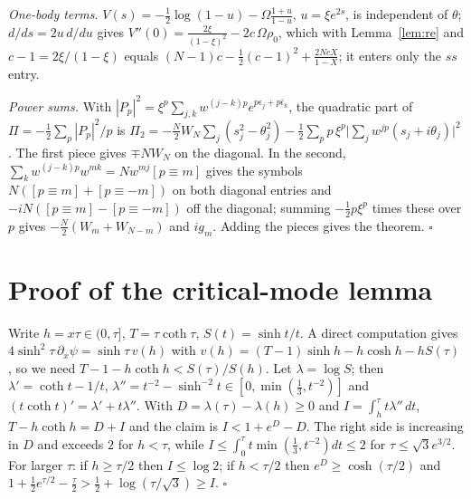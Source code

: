 \documentclass[11pt]{article}
\theoremstyle{definition}
\theoremstyle{remark}
\begin{document}
\emph{One-body terms.} $V(s)=-\frac12\log(1-u)-\Omega\frac{1+u}{1-u}$, $u=\xi e^{2s}$, is independent of $\theta$; $d/ds=2u\,d/du$ gives
$V''(0)=\frac{2\xi}{(1-\xi)^2}-2c\,\Omega\rho_0$, which with Lemma~\ref{lem:re} and $c-1=2\xi/(1-\xi)$ equals
$(N-1)c-\frac12(c-1)^2+\frac{2NcX}{1-X}$; it enters only the $ss$ entry.

\emph{Power sums.} With $|P_p|^2=\xi^p\sum_{j,k}w^{(j-k)p}e^{p\epsilon_j+p\bar\epsilon_k}$, the quadratic part of
$\Pi=-\frac12\sum_p|P_p|^2/p$ is
$\Pi_2=-\frac N2W_N\sum_j(s_j^2-\theta_j^2)-\frac12\sum_pp\,\xi^p\big|\sum_jw^{jp}(s_j+i\theta_j)\big|^2$. The first piece gives $\mp NW_N$ on
the diagonal. In the second, $\sum_kw^{(j-k)p}w^{mk}=Nw^{mj}[p\equiv m]$ gives the symbols $N([p\equiv m]+[p\equiv-m])$ on both diagonal
entries and $-iN([p\equiv m]-[p\equiv-m])$ off the diagonal; summing $-\frac12p\xi^p$ times these over $p$ gives
$-\frac N2(W_m+W_{N-m})$ and $ig_m$. Adding the pieces gives the theorem. \hfill$\square$

\section{Proof of the critical-mode lemma}\label{app:crit}
Write $h=x\tau\in(0,\tau]$, $T=\tau\coth\tau$, $S(t)=\sinh t/t$. A direct computation gives
$4\sinh^2\tau\,\partial_x\psi=\sinh\tau\,v(h)$ with $v(h)=(T-1)\sinh h-h\cosh h-hS(\tau)$, so we need $T-1-h\coth h<S(\tau)/S(h)$. Let
$\lambda=\log S$; then $\lambda'=\coth t-1/t$, $\lambda''=t^{-2}-\sinh^{-2}t\in[0,\min(\frac13,t^{-2})]$ and $(t\coth t)'=\lambda'+t\lambda''$.
With $D=\lambda(\tau)-\lambda(h)\ge0$ and $I=\int_h^\tau t\lambda''\,dt$, $T-h\coth h=D+I$ and the claim is $I<1+e^D-D$. The right side is
increasing in $D$ and exceeds $2$ for $h<\tau$, while $I\le\int_0^\tau t\min(\frac13,t^{-2})dt\le2$ for $\tau\le\sqrt3e^{3/2}$. For larger
$\tau$: if $h\ge\tau/2$ then $I\le\log2$; if $h<\tau/2$ then $e^D\ge\cosh(\tau/2)$ and $1+\frac12e^{\tau/2}-\frac\tau2>\frac12+\log(\tau/\sqrt3)\ge I$.
\hfill$\square$
\end{document}
